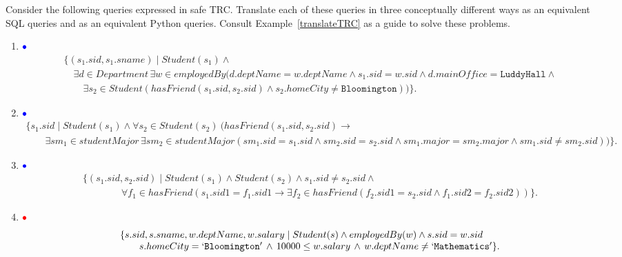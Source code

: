 \documentclass{article}
\newcommand{\red}[1]{{\color{red}#1}}
\newcommand{\blue}[1]{{\color{blue}#1}}
\newcommand{\redbullet}{$\red{\bullet}$}
\newcommand{\bluebullet}{$\blue{\bullet}$}
\begin{document}
Consider the following queries expressed in safe TRC.   Translate each of these queries in three conceptually 
different ways as an equivalent SQL queries and as an equivalent Python queries.    Consult Example~\ref{translateTRC} as a guide to solve these problems.

\newpage
\begin{enumerate}[resume]

\item  \bluebullet\ 
{\tiny
\[
\begin{array}{ll}
\{(s_1.sid, s_1.sname)\mid Student(s_1) \land \\
\quad \exists d \in Department\,\exists w \in employedBy (d.deptName = w.deptName \land s_1.sid = w.sid \land d.mainOffice = \mathtt{LuddyHall} \land \\
\quad \quad \exists s_2 \in Student
(hasFriend(s_1.sid,s_2.sid) \land s_2.homeCity \neq \mathtt{Bloomington}))\}.
\end{array}
\]
}

\item \bluebullet\ 
{\tiny
\[
\begin{array}{ll}
\{s_1.sid \mid Student(s_1) \land 
\forall s_2\in Student(s_2)\ (hasFriend(s_1.sid,s_2.sid) \rightarrow \\
\qquad\exists sm_1\in studentMajor\,\exists sm_2\in studentMajor
(sm_1.sid = s_1.sid \land sm_2.sid = s_2.sid \land sm_1.major = sm_2.major \land sm_1.sid \neq sm_2.sid))\}.
\end{array}
\]
}




\item  \bluebullet\ 
{\tiny
\[
\begin{array}{ll}
\{(s_1.sid,s_2.sid)\mid Student(s_1) \land Student(s_2) \land s_1.sid \neq s_2.sid\land \\
\qquad\qquad\forall f_1\in hasFriend(s_1.sid1 = f_1.sid1 \rightarrow\exists f_2\in hasFriend (f_2.sid1 = s_2.sid\land
f_1.sid2 = f_2.sid2))\}.
\end{array}
\]
}










\item  \redbullet\ 
{\small
\[
\begin{array}{ll}
\{s.sid, s.sname, w.deptName, w.salary\mid Student(s) \land employedBy(w)\land s.sid = w.sid\\
\qquad s.homeCity = \mathtt{`Bloomington'}\, \land\, 10000 \leq w.salary\, \land\, w.deptName \neq \mathtt{`Mathematics'}\}.
\end{array}
\]
}



\end{enumerate}
\end{document}
